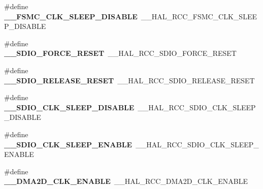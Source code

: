 \begin{DoxyCompactItemize}
\item 
\#define {\bfseries \+\_\+\+\_\+\+F\+S\+M\+C\+\_\+\+C\+L\+K\+\_\+\+S\+L\+E\+E\+P\+\_\+\+D\+I\+S\+A\+B\+LE}~\+\_\+\+\_\+\+H\+A\+L\+\_\+\+R\+C\+C\+\_\+\+F\+S\+M\+C\+\_\+\+C\+L\+K\+\_\+\+S\+L\+E\+E\+P\+\_\+\+D\+I\+S\+A\+B\+LE\hypertarget{group___h_a_l___r_c_c___aliased_gac9c95b2d35f501bc8c01d3ebe753df84}{}\label{group___h_a_l___r_c_c___aliased_gac9c95b2d35f501bc8c01d3ebe753df84}

\item 
\#define {\bfseries \+\_\+\+\_\+\+S\+D\+I\+O\+\_\+\+F\+O\+R\+C\+E\+\_\+\+R\+E\+S\+ET}~\+\_\+\+\_\+\+H\+A\+L\+\_\+\+R\+C\+C\+\_\+\+S\+D\+I\+O\+\_\+\+F\+O\+R\+C\+E\+\_\+\+R\+E\+S\+ET\hypertarget{group___h_a_l___r_c_c___aliased_gabe6865d9e0129c9ff78b5972aed8feaa}{}\label{group___h_a_l___r_c_c___aliased_gabe6865d9e0129c9ff78b5972aed8feaa}

\item 
\#define {\bfseries \+\_\+\+\_\+\+S\+D\+I\+O\+\_\+\+R\+E\+L\+E\+A\+S\+E\+\_\+\+R\+E\+S\+ET}~\+\_\+\+\_\+\+H\+A\+L\+\_\+\+R\+C\+C\+\_\+\+S\+D\+I\+O\+\_\+\+R\+E\+L\+E\+A\+S\+E\+\_\+\+R\+E\+S\+ET\hypertarget{group___h_a_l___r_c_c___aliased_gae34e3c64c3752da61570de340b8e61a8}{}\label{group___h_a_l___r_c_c___aliased_gae34e3c64c3752da61570de340b8e61a8}

\item 
\#define {\bfseries \+\_\+\+\_\+\+S\+D\+I\+O\+\_\+\+C\+L\+K\+\_\+\+S\+L\+E\+E\+P\+\_\+\+D\+I\+S\+A\+B\+LE}~\+\_\+\+\_\+\+H\+A\+L\+\_\+\+R\+C\+C\+\_\+\+S\+D\+I\+O\+\_\+\+C\+L\+K\+\_\+\+S\+L\+E\+E\+P\+\_\+\+D\+I\+S\+A\+B\+LE\hypertarget{group___h_a_l___r_c_c___aliased_ga5e192ce17bd87c40e3393ad2bd279c0c}{}\label{group___h_a_l___r_c_c___aliased_ga5e192ce17bd87c40e3393ad2bd279c0c}

\item 
\#define {\bfseries \+\_\+\+\_\+\+S\+D\+I\+O\+\_\+\+C\+L\+K\+\_\+\+S\+L\+E\+E\+P\+\_\+\+E\+N\+A\+B\+LE}~\+\_\+\+\_\+\+H\+A\+L\+\_\+\+R\+C\+C\+\_\+\+S\+D\+I\+O\+\_\+\+C\+L\+K\+\_\+\+S\+L\+E\+E\+P\+\_\+\+E\+N\+A\+B\+LE\hypertarget{group___h_a_l___r_c_c___aliased_ga9b44283bbb062d9b9547e1fbcfb2e46a}{}\label{group___h_a_l___r_c_c___aliased_ga9b44283bbb062d9b9547e1fbcfb2e46a}

\item 
\#define {\bfseries \+\_\+\+\_\+\+D\+M\+A2\+D\+\_\+\+C\+L\+K\+\_\+\+E\+N\+A\+B\+LE}~\+\_\+\+\_\+\+H\+A\+L\+\_\+\+R\+C\+C\+\_\+\+D\+M\+A2\+D\+\_\+\+C\+L\+K\+\_\+\+E\+N\+A\+B\+LE\hypertarget{group___h_a_l___r_c_c___aliased_gae062b5b5fc826afc4ad7a44434c4ce6d}{}\label{group___h_a_l___r_c_c___aliased_gae062b5b5fc826afc4ad7a44434c4ce6d}


\end{DoxyCompactItemize}
